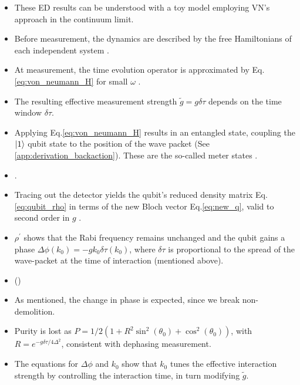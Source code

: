 \documentclass[10pt,
 amsmath,amssymb,
 aps,prb, twocolumn
]{revtex4-2}
\begin{document}
\begin{itemize}
    \item These ED results can be understood with a toy model employing VN's approach \cite{romito2012} in the continuum limit.

    \item Before measurement, the dynamics are described by the free Hamiltonians of each independent system \cite{siddiqi2024}.
    
    \item At measurement, the time evolution operator is approximated by Eq.\eqref{eq:von_neumann_H} for small $\omega$ \cite{vonNeumann1932}.
    
    \item The resulting effective measurement strength $\tilde{g}=g\delta \tau$ depends on the time window $\delta\tau$.
    
    \item Applying Eq.\eqref{eq:von_neumann_H} results in an entangled state, coupling the $\ket{1}$ qubit state to the position of the wave packet (See \ref{app:derivation_backaction}). These are the so-called meter states \cite{svensson2013}.

    \item {}.
    
    \item Tracing out the detector yields the qubit's reduced density matrix Eq.\eqref{eq:qubit_rho} in terms of the new Bloch vector Eq.\eqref{eq:new_q}, valid to second order in $g$ \cite{siddiqi2024}.
    
    \item $\rho^{'}$ shows that the Rabi frequency remains unchanged and the qubit gains a phase $\Delta \phi (k_0)=-g k_0\delta \tau (k_0)$, where $\delta \tau$ is proportional to the spread of the wave-packet at the time of interaction (mentioned above).
    
    \item ()
    
    \item As mentioned, the change in phase is expected, since we break non-demolition.
    
    \item Purity is lost as $P=1/2 (1+R^2 \sin^2 (\theta_0) + \cos^2(\theta_0))$, with $R = e^{-g\delta \tau/4\Delta^2}$, consistent with dephasing measurement.

    \item The equations for $\Delta \phi$ and $k_0$ show that $k_0$ tunes the effective interaction strength by controlling the interaction time, in turn modifying $\tilde{g}$.


\end{itemize}
\end{document}
